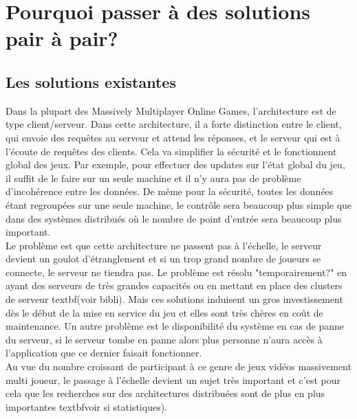 \section{Pourquoi passer à des solutions pair à pair?}
	\subsection{Les solutions existantes}
	Dans la plupart des Massively Multiplayer Online Games, l'architecture est de type client/serveur. Dans cette architecture, il a forte distinction entre le client, qui envoie des requêtes au serveur et attend les réponses, et le serveur qui est à l'écoute de requêtes des clients. Cela va simplifier la sécurité et le fonctionnent global des jeux. Par exemple, pour effectuer des updates sur l'état global du jeu, il suffit de le faire sur un seule machine et il n'y aura pas de problème d'incohérence entre les données. De même pour la sécurité, toutes les données étant regroupées sur une seule machine, le contrôle sera beaucoup plus simple que dans des systèmes distribués où le nombre de point d'entrée sera beaucoup plus important. \\
	Le problème est que cette architecture ne passent pas à l'échelle, le serveur devient un goulot d'étranglement et si un trop grand nombre de joueurs se connecte, le serveur ne tiendra pas. Le problème est résolu "temporairement?" en ayant des serveurs de très grandes capacités ou en mettant en place des clusters de serveur textbf{(voir bibli)}. Mais ces solutions induisent un gros investissement dès le début de la mise en service du jeu et elles sont très chères en coût de maintenance. Un autre problème est le disponibilité du système en cas de panne du serveur, si le serveur tombe en panne alors plus personne n'aura accès à l'application que ce dernier faisait fonctionner. \\
	Au vue du nombre croissant de participant à ce genre de jeux vidéos massivement multi joueur, le passage à l'échelle devient un sujet très important et c'est pour cela que les recherches sur des architectures distribuées sont de plus en plus importantes textbf{voir si statistiques)}. \\
\newline


